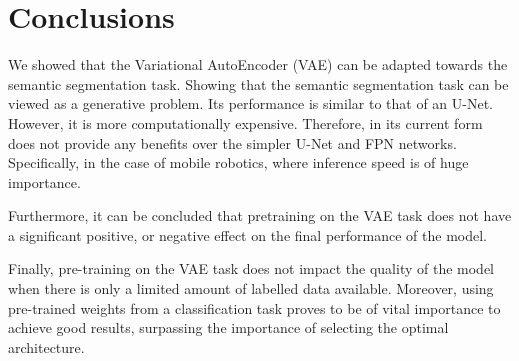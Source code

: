 \chapter{Conclusions}\label{chapter:conclusions}

We showed that the Variational AutoEncoder (VAE) can be adapted towards the semantic segmentation task. Showing that the semantic segmentation task can be viewed as a generative problem. Its performance is similar to that of an U-Net. However, it is more computationally expensive. Therefore, in its current form does not provide any benefits over the simpler U-Net and FPN networks. Specifically, in the case of mobile robotics, where inference speed is of huge importance.

Furthermore, it can be concluded that pretraining on the VAE task does not have a significant positive, or negative effect on the final performance of the model. 

Finally, pre-training on the VAE task does not impact the quality of the model when there is only a limited amount of labelled data available. Moreover, using pre-trained weights from a classification task proves to be of vital importance to achieve good results, surpassing the importance of selecting the optimal architecture.
